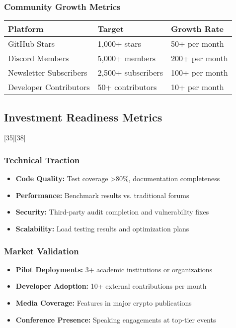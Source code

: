 \documentclass[12pt,a4paper]{article}
\begin{document}
\subsubsection{Community Growth Metrics}
\begin{center}
\begin{tabular}{|l|l|l|}
\hline
\textbf{Platform} & \textbf{Target} & \textbf{Growth Rate} \\
\hline
GitHub Stars & 1,000+ stars & 50+ per month \\
Discord Members & 5,000+ members & 200+ per month \\
Newsletter Subscribers & 2,500+ subscribers & 100+ per month \\
Developer Contributors & 50+ contributors & 10+ per month \\
\hline
\end{tabular}
\end{center}

\subsection{Investment Readiness Metrics}[35][38]

\subsubsection{Technical Traction}
\begin{itemize}
    \item \textbf{Code Quality:} Test coverage >80\%, documentation completeness
    \item \textbf{Performance:} Benchmark results vs. traditional forums
    \item \textbf{Security:} Third-party audit completion and vulnerability fixes
    \item \textbf{Scalability:} Load testing results and optimization plans
\end{itemize}

\subsubsection{Market Validation}
\begin{itemize}
    \item \textbf{Pilot Deployments:} 3+ academic institutions or organizations
    \item \textbf{Developer Adoption:} 10+ external contributions per month
    \item \textbf{Media Coverage:} Features in major crypto publications
    \item \textbf{Conference Presence:} Speaking engagements at top-tier events
\end{itemize}
\end{document}
